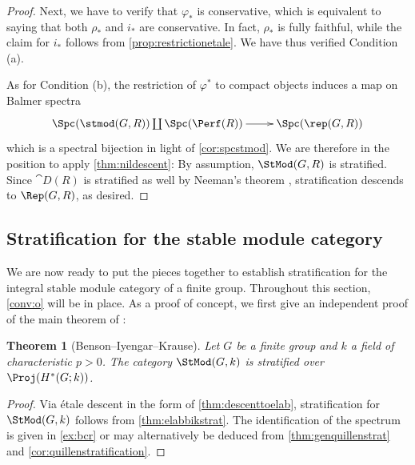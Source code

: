 \documentclass{amsart}%
\numberwithin{equation}{section}%
\newtheorem{Thm}[equation]{Theorem}
\theoremstyle{remark}
\begin{document}
\begin{proof}
Next, we have to verify that $\varphi_*$ is conservative, which is equivalent to saying that both $\rho_*$ and $i_*$ are conservative. In fact, $\rho_*$ is fully faithful, while the claim for $i_*$ follows from \cref{prop:restrictionetale}. We have thus verified Condition (a).

As for Condition (b), the restriction of $\varphi^*$ to compact objects induces a map on Balmer spectra
\[
\xymatrix{\Spc(\stmod(G,R)) \coprod \Spc(\Perf(R)) \ar[r] & \Spc(\rep(G,R))}
\]
which is a spectral bijection in light of \cref{cor:spcstmod}. We are therefore in the position to apply \cref{thm:nildescent}: By assumption, $\StMod(G,R)$ is stratified. Since $\cat D(R)$ is stratified as well by Neeman's theorem \cite[Thm.~2.8]{Neeman92a}, stratification descends to $\Rep(G,R)$, as desired.
\end{proof}



\subsection{Stratification for the stable module category}\label{ssec:stratstmod}

We are now ready to put the pieces together to establish stratification for the integral stable module category of a finite group. Throughout this section, \cref{conv:o} will be in place. As a proof of concept, we first give an independent proof of the main theorem of \cite{BensonIyengarKrause11a}:

\begin{Thm}[Benson--Iyengar--Krause]
Let $G$ be a finite group and $k$ a field of characteristic $p>0$. The category $\StMod(G,k)$ is stratified over $\Proj(H^*(G;k))$.
\end{Thm}
\begin{proof}
Via \'etale descent in the form of \cref{thm:descenttoelab}, stratification for $\StMod(G,k)$ follows from \cref{thm:elabbikstrat}. The identification of the spectrum is given in \cref{ex:bcr} or may alternatively be deduced from \cref{thm:genquillenstrat} and \cref{cor:quillenstratification}.
\end{proof}
\end{document}
